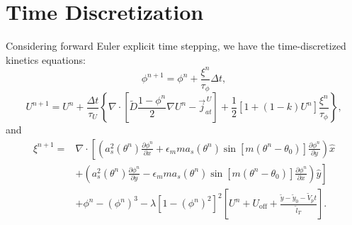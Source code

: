 \documentclass[10pt]{article}
\begin{document}
\section{Time Discretization}
Considering forward Euler explicit time stepping, we have the time-discretized kinetics equations:
\begin{equation}
\phi^{n+1}=\phi^{n} + \frac{\xi^n}{\tau_\phi}\Delta t,
\end{equation}
\begin{equation}
U^{n+1}=U^{n}+\frac{\Delta t}{\tau_U}\left\{\nabla \cdot \left[ \tilde{D}\frac{1-\phi^n}{2} \nabla U^n - \vec{j}_{at}^{\,U} \right] + \frac{1}{2}[1+(1-k)U^n]\frac{\xi^n}{\tau_\phi} \right\},
\label{ueq_td}
\end{equation}
and
\begin{equation}
\begin{split}
\xi^{n+1} = & \nabla \cdot  \left[ \left(a_s^2(\theta^n) \frac{\partial \phi^n}{\partial x} + \epsilon_m m a_s(\theta^n) \sin \left[ m \left(\theta^n - \theta_0 \right) \right] \frac{\partial \phi^n}{\partial y}\right)\hat{x} \right. \\ 
& \left . + \left(a_s^2(\theta^n) \frac{\partial \phi^n}{\partial y} - \epsilon_m m a_s(\theta^n) \sin \left[ m \left(\theta^n - \theta_0 \right) \right] \frac{\partial \phi^n}{\partial x}\right)\hat{y}\right] \\
& +\phi^n-(\phi^n)^3 - \lambda \left[1-(\phi^n)^2\right]^2 \left[ U^n + U_\text{off} + \frac{\tilde{y} - \tilde{y}_0 - \tilde{V}_p t}{\tilde{l}_T} \right].
\end{split}
\end{equation}
\end{document}

